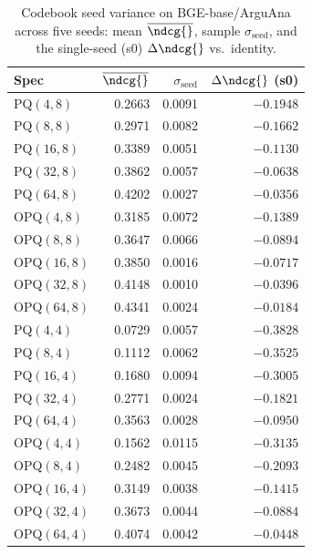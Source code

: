 \begin{table}[t]
\centering
\small
\caption{Codebook seed variance on BGE-base/ArguAna across five seeds: mean $\overline{\ndcg{}}$, sample $\sigma_{\text{seed}}$, and the single-seed (s0) $\Delta\ndcg{}$ vs.\ identity.}
\label{tab:seed-variance}
\begin{tabular}{lrrr}
\toprule
Spec & $\overline{\ndcg{}}$ & $\sigma_{\text{seed}}$ & $\Delta\ndcg{}$ (s0) \\
\midrule
PQ$(4,8)$ & 0.2663 & 0.0091 & $-0.1948$ \\
PQ$(8,8)$ & 0.2971 & 0.0082 & $-0.1662$ \\
PQ$(16,8)$ & 0.3389 & 0.0051 & $-0.1130$ \\
PQ$(32,8)$ & 0.3862 & 0.0057 & $-0.0638$ \\
PQ$(64,8)$ & 0.4202 & 0.0027 & $-0.0356$ \\
OPQ$(4,8)$ & 0.3185 & 0.0072 & $-0.1389$ \\
OPQ$(8,8)$ & 0.3647 & 0.0066 & $-0.0894$ \\
OPQ$(16,8)$ & 0.3850 & 0.0016 & $-0.0717$ \\
OPQ$(32,8)$ & 0.4148 & 0.0010 & $-0.0396$ \\
OPQ$(64,8)$ & 0.4341 & 0.0024 & $-0.0184$ \\
PQ$(4,4)$ & 0.0729 & 0.0057 & $-0.3828$ \\
PQ$(8,4)$ & 0.1112 & 0.0062 & $-0.3525$ \\
PQ$(16,4)$ & 0.1680 & 0.0094 & $-0.3005$ \\
PQ$(32,4)$ & 0.2771 & 0.0024 & $-0.1821$ \\
PQ$(64,4)$ & 0.3563 & 0.0028 & $-0.0950$ \\
OPQ$(4,4)$ & 0.1562 & 0.0115 & $-0.3135$ \\
OPQ$(8,4)$ & 0.2482 & 0.0045 & $-0.2093$ \\
OPQ$(16,4)$ & 0.3149 & 0.0038 & $-0.1415$ \\
OPQ$(32,4)$ & 0.3673 & 0.0044 & $-0.0884$ \\
OPQ$(64,4)$ & 0.4074 & 0.0042 & $-0.0448$ \\
\bottomrule
\end{tabular}
\end{table}

